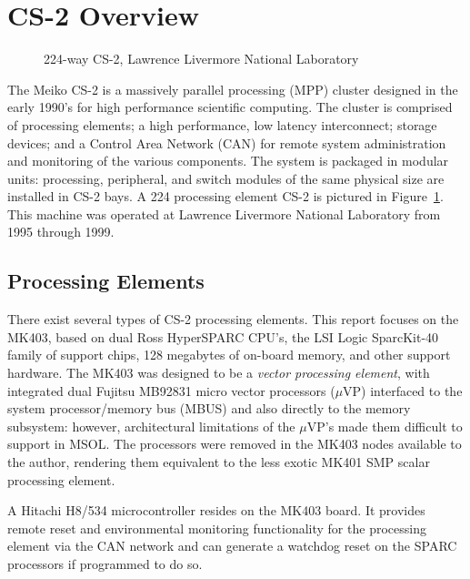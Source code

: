 \documentclass{article}
\begin{document}
\section{CS-2 Overview}
\label{overview}

\begin{figure}
\begin{center}
\caption{224-way CS-2, Lawrence Livermore National Laboratory}
\label{256way}
\end{center}
\end{figure}

  The Meiko CS-2 is a massively parallel processing (MPP) cluster designed 
in the early 1990's for high performance scientific computing.  
The cluster is comprised of processing elements; a high performance, 
low latency interconnect;  storage devices;  and a Control Area Network (CAN)
for remote system administration and monitoring of the various components.
The system is packaged in modular units: processing, peripheral, and switch
modules of the same physical size are installed in CS-2 bays.
A 224 processing element CS-2 is pictured in Figure~\ref{256way}.
This machine was operated at Lawrence Livermore National Laboratory 
from 1995 through 1999.

\subsection{Processing Elements}

There exist several types of CS-2 processing elements.  
This report focuses on the MK403\cite{Meiko95e}, 
based on dual Ross HyperSPARC CPU's\cite{Ross93}, 
the LSI Logic SparcKit-40 family of support chips, 128 megabytes of 
on-board memory, and other support hardware.
The MK403 was designed to be a {\em vector processing element}, with
integrated dual Fujitsu MB92831 micro vector processors ($\mu$VP) 
interfaced to 
the system processor/memory bus (MBUS) and also directly to the memory 
subsystem:
however, architectural limitations of the $\mu$VP's made them difficult to 
support in MSOL.  
The processors were removed in the MK403 nodes available to the 
author, rendering them equivalent to the less exotic MK401\cite{Meiko95d}
SMP scalar processing element.

  A Hitachi H8/534 microcontroller resides on the MK403 board.
It provides remote reset and environmental monitoring functionality for the 
processing element via the CAN network and can generate a watchdog reset on 
the SPARC processors if programmed to do so.
\end{document}
